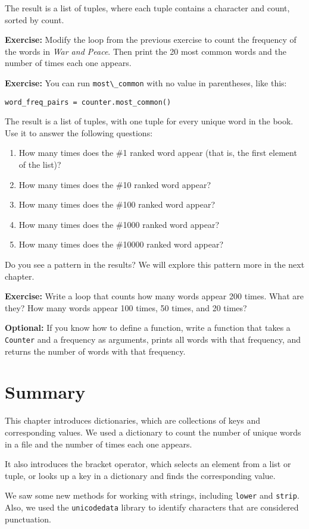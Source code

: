 The result is a list of tuples, where each tuple contains a character
and count, sorted by count.

\textbf{Exercise:} Modify the loop from the previous exercise to count
the frequency of the words in \emph{War and Peace}. Then print the 20
most common words and the number of times each one appears.

\textbf{Exercise:} You can run \passthrough{\lstinline!most\_common!}
with no value in parentheses, like this:

\begin{lstlisting}[style=output]
word_freq_pairs = counter.most_common()
\end{lstlisting}

The result is a list of tuples, with one tuple for every unique word in
the book. Use it to answer the following questions:

\begin{enumerate}
\def\labelenumi{\arabic{enumi}.}
\item
  How many times does the \#1 ranked word appear (that is, the first
  element of the list)?
\item
  How many times does the \#10 ranked word appear?
\item
  How many times does the \#100 ranked word appear?
\item
  How many times does the \#1000 ranked word appear?
\item
  How many times does the \#10000 ranked word appear?
\end{enumerate}

Do you see a pattern in the results? We will explore this pattern more
in the next chapter.

\textbf{Exercise:} Write a loop that counts how many words appear 200
times. What are they? How many words appear 100 times, 50 times, and 20
times?

\textbf{Optional:} If you know how to define a function, write a
function that takes a \passthrough{\lstinline!Counter!} and a frequency
as arguments, prints all words with that frequency, and returns the
number of words with that frequency.

\section{Summary}\label{summary}

This chapter introduces dictionaries, which are collections of keys and
corresponding values. We used a dictionary to count the number of unique
words in a file and the number of times each one appears.

It also introduces the bracket operator, which selects an element from a
list or tuple, or looks up a key in a dictionary and finds the
corresponding value.

We saw some new methods for working with strings, including
\passthrough{\lstinline!lower!} and \passthrough{\lstinline!strip!}.
Also, we used the \passthrough{\lstinline!unicodedata!} library to
identify characters that are considered punctuation.

